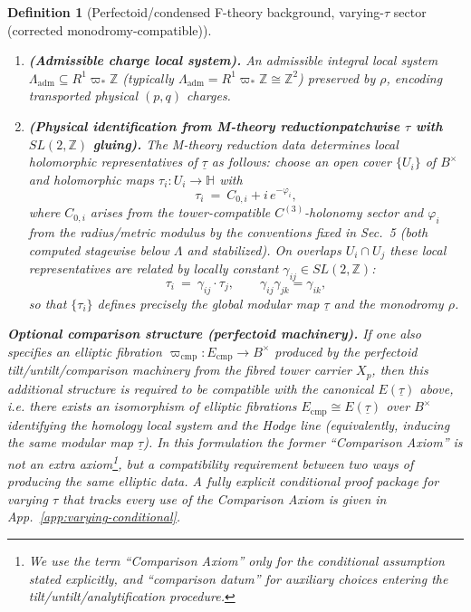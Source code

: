 \documentclass[11pt]{article}
\newtheorem{definition}[theorem]{Definition}
\theoremstyle{remark}
\begin{document}
\begin{definition}[Perfectoid/condensed F-theory background, varying-$\tau$ sector (corrected monodromy-compatible)]
\begin{enumerate}
\item \textbf{(Admissible charge local system).}
An admissible integral local system $\Lambda_{\mathrm{adm}}\subseteq R^1\varpi_*\mathbb{Z}$ (typically $\Lambda_{\mathrm{adm}}=R^1\varpi_*\mathbb{Z}\cong \mathbb{Z}^2$)
preserved by $\rho$, encoding transported physical $(p,q)$ charges.

\item \textbf{(Physical identification from M-theory reduction\:patchwise $\tau$ with $SL(2,\mathbb{Z})$ gluing).}
The M-theory reduction data determines \emph{local} holomorphic representatives of $\underline{\tau}$ as follows:
choose an open cover $\{U_i\}$ of $B^\times$ and holomorphic maps $\tau_i:U_i\to\mathbb{H}$ with
\begin{equation}
\tau_i\ =\ C_{0,i}+i\,e^{-\varphi_i},
\end{equation}
where $C_{0,i}$ arises from the tower-compatible $C^{(3)}$-holonomy sector and $\varphi_i$ from the radius/metric modulus
by the conventions fixed in Sec.~5 (both computed stagewise below $\Lambda$ and stabilized).
On overlaps $U_i\cap U_j$ these local representatives are related by locally constant $\gamma_{ij}\in SL(2,\mathbb{Z})$:
\begin{equation}
\tau_i\ =\ \gamma_{ij}\cdot \tau_j,\qquad \gamma_{ij}\gamma_{jk}=\gamma_{ik},
\end{equation}
so that $\{\tau_i\}$ defines precisely the global modular map $\underline{\tau}$ and the monodromy $\rho$.
\end{enumerate}

\medskip
\noindent\textbf{Optional comparison structure (perfectoid machinery).}
If one also specifies an elliptic fibration $\varpi_{\mathrm{cmp}}:E_{\mathrm{cmp}}\to B^\times$ produced by the
perfectoid tilt/untilt/comparison machinery from the fibred tower carrier $X_p$, then this additional structure is required to be
\emph{compatible} with the canonical $E(\underline{\tau})$ above, i.e. there exists an isomorphism of elliptic fibrations
$E_{\mathrm{cmp}}\cong E(\underline{\tau})$ over $B^\times$ identifying the homology local system and the Hodge line (equivalently,
inducing the same modular map $\underline{\tau}$). In this formulation the former “Comparison Axiom” is not an extra axiom\footnote{We use the term ``Comparison Axiom'' only for the conditional assumption stated explicitly, and ``comparison datum'' for auxiliary choices entering the tilt/untilt/analytification procedure.
},
but a compatibility requirement between two ways of producing the same elliptic data. A fully explicit conditional proof package for varying $\tau$ that tracks every use of the Comparison Axiom is given in App.~\ref{app:varying-conditional}.




\end{definition}
\end{document}
